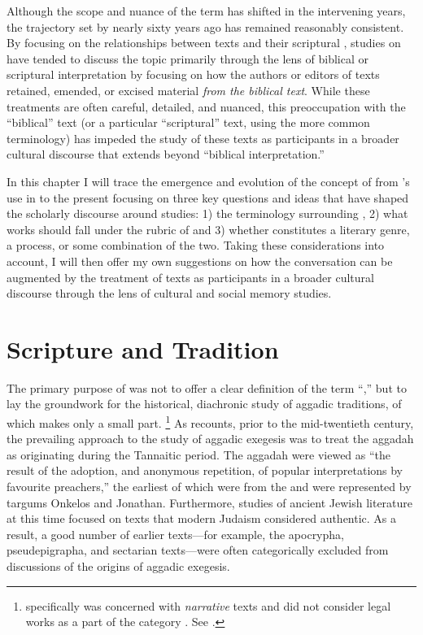 Although the scope and nuance of the term \rwb has shifted in the intervening years, the trajectory set by \vermes nearly sixty years ago has remained reasonably consistent. By focusing on the relationships between \rwb texts and their scriptural \vorlagen, studies on \rwb have tended to discuss the topic primarily through the lens of biblical or scriptural interpretation by focusing on how the authors or editors of \rwb texts retained, emended, or excised material \emph{from the biblical text}. While these treatments are often careful, detailed, and nuanced, this preoccupation with the ``biblical'' text (or a particular ``scriptural'' text, using the more common terminology) has impeded the study of these texts as participants in a broader cultural discourse that extends beyond ``biblical interpretation.''

In this chapter I will trace the emergence and evolution of the concept of \rwb from \vermes's use in  to the present focusing on three key questions and ideas that have shaped the scholarly discourse around \rwb studies: 1) the terminology surrounding \rwb, 2) what works should fall under the rubric of \rwb and 3) whether \rwb constitutes a literary genre, a process, or some combination of the two. Taking these considerations into account, I will then offer my own suggestions on how the \rwb conversation can be augmented by the treatment of \rwb texts as participants in a broader cultural discourse through the lens of cultural and social memory studies.

\section{Scripture and Tradition}

The primary purpose of  was not to offer a clear definition of the term ``\rwb,'' but to lay the groundwork for the historical, diachronic study of aggadic traditions, of which \rwb makes only a small part.%
    \footnote{%
        \vermes specifically was concerned with \emph{narrative} texts and did not consider legal works as a part of the category \rwb. See 
        \cite[3]{vermes_zsengeller2014}.}
As \vermes recounts, prior to the mid-twentieth century, the prevailing approach to the study of aggadic exegesis was to treat the aggadah as originating during the Tannaitic period. The aggadah were viewed as ``the result of the adoption, and anonymous repetition, of popular interpretations by favourite preachers,''%
    \autocite[3]{vermes1961}
the earliest of which were from the  and were represented by targums Onkelos and Jonathan. Furthermore, studies of ancient Jewish literature at this time focused on texts that modern Judaism considered authentic. As a result, a good number of earlier texts---for example, the apocrypha, pseudepigrapha, and sectarian texts---were often categorically excluded from discussions of the origins of aggadic exegesis.%
    \autocite[2]{vermes1961} 

